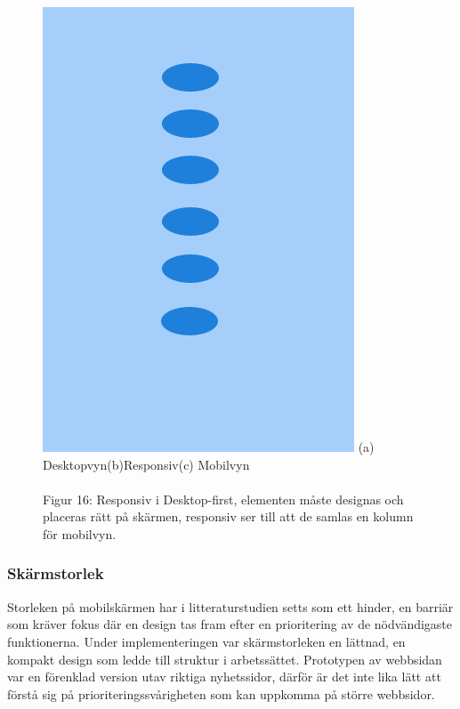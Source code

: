 \documentclass[11pt]{article}
\begin{document}
\begin{figure}[H]
{\includegraphics[scale=0.27]{pics/mobiledots.png}%
}
\hspace{1.7cm}(a) Desktopvyn\hspace{2.3cm}(b)Responsiv\hspace{2.1cm}(c) Mobilvyn
\\\\
\hspace{0.15cm}Figur 16: Responsiv i Desktop-first, elementen måste designas och placeras rätt på skärmen, responsiv ser till att de samlas en kolumn för mobilvyn.
\end{figure}


\subsubsection{Skärmstorlek}
Storleken på mobilskärmen har i litteraturstudien setts som ett hinder, en barriär som kräver fokus där en design tas fram efter en prioritering av de nödvändigaste funktionerna. Under implementeringen var skärmstorleken en lättnad, en kompakt design som ledde till struktur i arbetssättet. Prototypen av webbsidan var en förenklad version utav riktiga nyhetssidor, därför är det inte lika lätt att förstå sig på prioriteringssvårigheten som kan uppkomma på större webbsidor.
\end{document}
